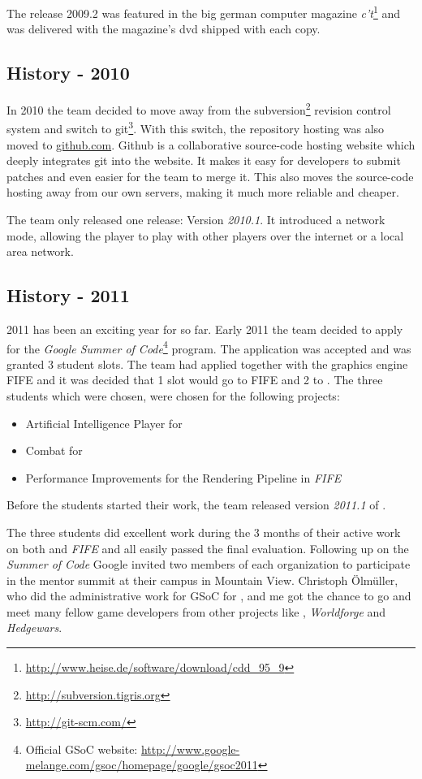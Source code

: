 The release 2009.2 was featured in the big german computer magazine \textit{c't}\footnote{\url{http://www.heise.de/software/download/cdd_95_9}} and was delivered with the magazine's
dvd shipped with each copy. 

\subsection{History - 2010}
In 2010 the team decided to move away from the subversion\footnote{\url{http://subversion.tigris.org}} revision control
system and switch to git\footnote{\url{http://git-scm.com/}}. With this switch, the repository hosting was also moved to
\href{http://www.github.com}{github.com}. Github is a collaborative source-code hosting website which deeply integrates
git into the website. It makes it easy for developers to submit patches and even easier for the team to merge it. This
also moves the source-code hosting away from our own servers, making it much more reliable and cheaper.

The team only released one release: Version \textit{2010.1}. It introduced a network mode, allowing the player
to play with other players over the internet or a local area network.

\subsection{History - 2011}
2011 has been an exciting year for \UH{} so far. Early 2011 the team decided to apply for the \textit{Google Summer of
Code}\footnote{Official GSoC website: \url{http://www.google-melange.com/gsoc/homepage/google/gsoc2011}} program. The
application was accepted and \UH{} was granted 3 student slots. The team had applied together with the graphics engine
FIFE and it was decided that 1 slot would go to FIFE and 2 to \UH{}. The three students which were chosen, were chosen
for the following projects:
\begin{itemize}
    \item Artificial Intelligence Player for \UH{}
    \item Combat for \UH{}
    \item Performance Improvements for the Rendering Pipeline in \textit{FIFE}
\end{itemize}
Before the students started their work, the team released version \textit{2011.1} of \UH{}.

The three students did excellent work during the 3 months of their active work on both \UH{} and \textit{FIFE} and all
easily passed the final evaluation. Following up on the \textit{Summer of Code} Google invited two members of each
organization to participate in the mentor summit at their campus in Mountain View. Christoph Ölmüller, who did the
administrative work for GSoC for \UH{}, and me got the chance to go and meet many fellow \OS{} game developers
from other projects like \BOW{}, \textit{Worldforge} and \textit{Hedgewars}.

